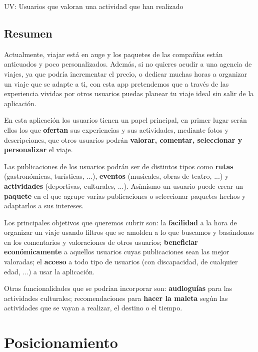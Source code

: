 \documentclass[11pt]{article}
\begin{document}
UV: Usuarios que valoran una actividad que han realizado

\subsection{Resumen}
Actualmente, viajar está en auge y los paquetes de las compañías están anticuados y poco personalizados. Además, si no quieres acudir a una agencia de viajes, ya que podría incrementar el precio, o dedicar muchas horas a organizar un viaje que se adapte a ti, con esta app pretendemos que a través de las experiencia vividas por otros usuarios puedas planear tu viaje ideal sin salir de la aplicación.

En esta aplicación los usuarios tienen un papel principal, en primer lugar serán ellos los que \textbf{ofertan} sus experiencias y sus actividades, mediante fotos y descripciones, que otros usuarios podrán \textbf{valorar, comentar, seleccionar y personalizar} el viaje.

Las publicaciones de los usuarios podrán ser de distintos tipos como \textbf{rutas} (gastronómicas, turísticas, ...), \textbf{eventos} (musicales, obras de teatro, ...) y \textbf{actividades} (deportivas, culturales, ...). Asímismo un usuario puede crear un \textbf{paquete} en el que agrupe varias publicaciones o seleccionar paquetes hechos y adaptarlos a sus intereses.

Los principales objetivos que queremos cubrir son: la \textbf{facilidad} a la hora de organizar un viaje usando filtros que se amolden a lo que buscamos y basándonos en los comentarios y valoraciones de otros usuarios; \textbf{beneficiar económicamente} a aquellos usuarios cuyas publicaciones sean las mejor valoradas; el \textbf{acceso} a todo tipo de usuarios (con discapacidad, de cualquier edad, ...) a usar la aplicación.

Otras funcionalidades que se podrían incorporar son: \textbf{audioguías} para las actividades culturales; recomendaciones para \textbf{hacer la maleta} según las actividades que se vayan a realizar, el destino o el tiempo.

\newpage

\section{Posicionamiento}
\end{document}
